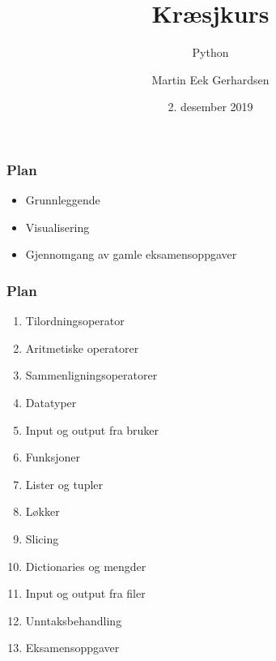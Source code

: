 \documentclass[screen, aspectratio=43]{beamer}
\title[Kræsjkurs]{Kræsjkurs}
\subtitle{Python}
\author[M. E. Gerhardsen]{Martin Eek Gerhardsen}
\institute[NTNU]{Institutt for Teknisk Kybernetikk, NTNU}
\date{2. desember 2019}
\begin{document}
\begin{frame} 
\titlepage
\end{frame} 

\begin{frame}
    \frametitle{Plan}

    \begin{itemize}
        \item Grunnleggende
        \item Visualisering
        \item Gjennomgang av gamle eksamensoppgaver 
    \end{itemize}

\end{frame}

\begin{frame}
    \frametitle{Plan}

    \begin{enumerate}
        \item Tilordningsoperator
        \item Aritmetiske operatorer
        \item Sammenligningsoperatorer
        \item Datatyper
        \item Input og output fra bruker
        \item Funksjoner 
        \item Lister og tupler
        \item Løkker 
        \item Slicing 
        \item Dictionaries og mengder 
        \item Input og output fra filer 
        \item Unntaksbehandling
        \item Eksamensoppgaver
    \end{enumerate}

\end{frame}













\end{document}
